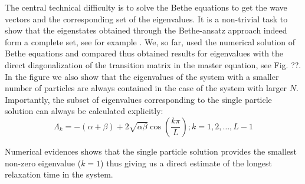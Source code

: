 \documentclass[aps,showpacs,twocolumn,floatfix,prx,superscriptaddress]{revtex4-1}
\begin{document}
The central technical difficulty is to solve the Bethe equations to get the wave vectors and the corresponding set of the eigenvalues. It is a non-trivial task to show that the eigenstates obtained through the Bethe-ansatz approach indeed form a complete set, see for example \cite{}. We, so far, used the numerical solution of Bethe equations and compared thus obtained results for eigenvalues with the direct diagonalization of the transition matrix in the master equation, see Fig. ??. In the figure we also show that the eigenvalues of the system with a smaller number of particles are always contained in the case of the system with larger $N$. Importantly, the subset of eigenvalues corresponding to the single particle solution can always be calculated explicitly: 
\begin{subequations}
    \label{eq:eigenN}
    \begin{equation}
        \label{eq:partEigenvaluesN}
        \Lambda_k   = -(\alpha+\beta) + 2\sqrt{\alpha\beta}\cos(\frac{k\pi}{L}); 
        k=1,2,\dots, L-1  
    \end{equation}
\end{subequations}

Numerical evidences shows that the single particle solution provides the smallest non-zero eigenvalue ($k=1$) thus giving us a direct estimate of the longest relaxation time in the system.  

\end{document}
